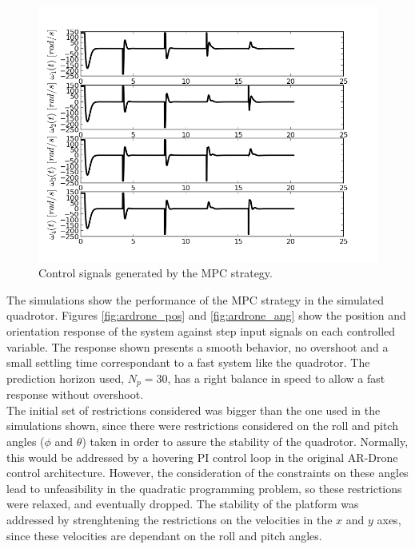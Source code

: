 \begin{figure}[h!]
\centering
\includegraphics[scale=0.7]{Images/Chapter5/ardrone/control_signals.png}
\caption{Control signals generated by the MPC strategy.}
\label{fig:ardrone_inputs}
\end{figure}

The simulations show the performance of the MPC strategy in the simulated quadrotor. Figures \ref{fig:ardrone_pos} and \ref{fig:ardrone_ang} show the position and orientation  response of the system against step input signals on each controlled variable. The response shown presents a smooth behavior, no overshoot and a small settling time correspondant to a fast system like the quadrotor. The prediction horizon used, $N_p = 30$, has a right balance in speed to allow a fast response without overshoot.\\

The initial set of restrictions considered was bigger than the one used in the simulations shown, since there were restrictions considered on the roll and pitch angles ($\phi$ and $\theta$) taken in order to assure the stability of the quadrotor. Normally, this would be addressed by a hovering PI control loop in the original AR-Drone control architecture. However, the consideration of the constraints on these angles lead to unfeasibility in the quadratic programming problem, so  these restrictions were relaxed, and eventually dropped. The stability of the platform was addressed by strenghtening the restrictions on the velocities in the $x$ and $y$ axes, since these velocities are dependant on the roll and pitch angles. \\

